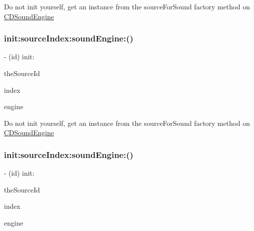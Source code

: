 Do not init yourself, get an instance from the source\+For\+Sound factory method on \hyperlink{interfaceCDSoundEngine}{C\+D\+Sound\+Engine} \mbox{\label{interfaceCDSoundSource_a1238cf4aee74d345437dba31efce78ab}} 
\subsubsection{\texorpdfstring{init\+:source\+Index\+:sound\+Engine\+:()}{init:sourceIndex:soundEngine:()}\hspace{0.1cm}{\footnotesize\ttfamily [3/4]}}
{\footnotesize\ttfamily -\/ (id) init\+: \begin{DoxyParamCaption}\item[{(A\+Luint)}]{the\+Source\+Id }\item[{sourceIndex:(int)}]{index }\item[{soundEngine:(\hyperlink{interfaceCDSoundEngine}{C\+D\+Sound\+Engine} $\ast$)}]{engine }\end{DoxyParamCaption}}

Do not init yourself, get an instance from the source\+For\+Sound factory method on \hyperlink{interfaceCDSoundEngine}{C\+D\+Sound\+Engine} \mbox{\label{interfaceCDSoundSource_a1238cf4aee74d345437dba31efce78ab}} 
\subsubsection{\texorpdfstring{init\+:source\+Index\+:sound\+Engine\+:()}{init:sourceIndex:soundEngine:()}\hspace{0.1cm}{\footnotesize\ttfamily [4/4]}}
{\footnotesize\ttfamily -\/ (id) init\+: \begin{DoxyParamCaption}\item[{(A\+Luint)}]{the\+Source\+Id }\item[{sourceIndex:(int)}]{index }\item[{soundEngine:(\hyperlink{interfaceCDSoundEngine}{C\+D\+Sound\+Engine} $\ast$)}]{engine }\end{DoxyParamCaption}}

